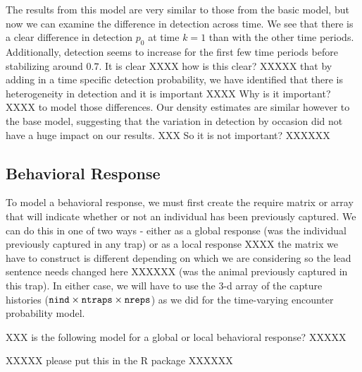 The results from this model are very similar to those from the basic
model, but now we can examine the difference in detection across time.
We see that there is a clear difference in detection $p_0$ at time $k=1$
than with the other time periods.  Additionally, detection seems to
increase for the first few time periods before stabilizing around $0.7$.
It is clear XXXX how is this clear? XXXXX
that by adding in a time specific detection probability,
we have identified that there is heterogeneity in detection and it is
important XXXX Why is it important? XXXX
to model those differences.  Our density estimates are
similar however to the base model, suggesting that the variation in
detection by occasion did not have a huge impact on our results. XXX
So it is not important? XXXXXX 

\subsection{Behavioral Response}


To model a behavioral response, we must first create the require matrix or
array that will indicate whether or not an individual has been previously
captured.  We can do this in one of two ways - either as a
global response (was the individual previously captured in any trap)
or as a local response XXXX the matrix we have to construct is
different depending on which we are considering so the lead sentence
needs changed here XXXXXX
(was the animal previously captured in this
trap).  In either case, we will have to use the 3-d array of the
capture histories ($\mbox{\tt nind} \times \mbox{\tt ntraps} \times
\mbox{\tt nreps}$) as we did for the time-varying encounter probability
model.  


XXX is the following model for a global or local behavioral response? XXXXX

XXXXX please put this in the R package XXXXXX

